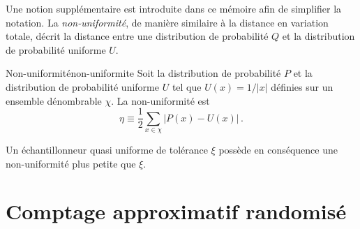  Une notion supplémentaire est introduite dans ce mémoire afin de simplifier la notation. La \textit{non-uniformité}, de manière similaire à la distance en variation totale, décrit la distance entre une distribution de probabilité $Q$ et la distribution de probabilité uniforme $U$.

\begin{maindefinition}{Non-uniformité}{non-uniformite}
    Soit la distribution de probabilité $P$ et la distribution de probabilité uniforme $U$ tel que $U(x) = 1/\lvert x \rvert$ définies sur un ensemble dénombrable $\chi$. La non-uniformité est
    \begin{equation*}
        \eta \equiv \frac{1}{2} \sum_{x \in \chi} \lvert P(x) - U(x) \rvert \,. 
    \end{equation*}
\end{maindefinition}

Un échantillonneur quasi uniforme de tolérance $\xi$ possède en conséquence une non-uniformité plus petite que $\xi$.


\section{Comptage approximatif randomisé}
\label{sec:comptage-approximatif-randomise}

